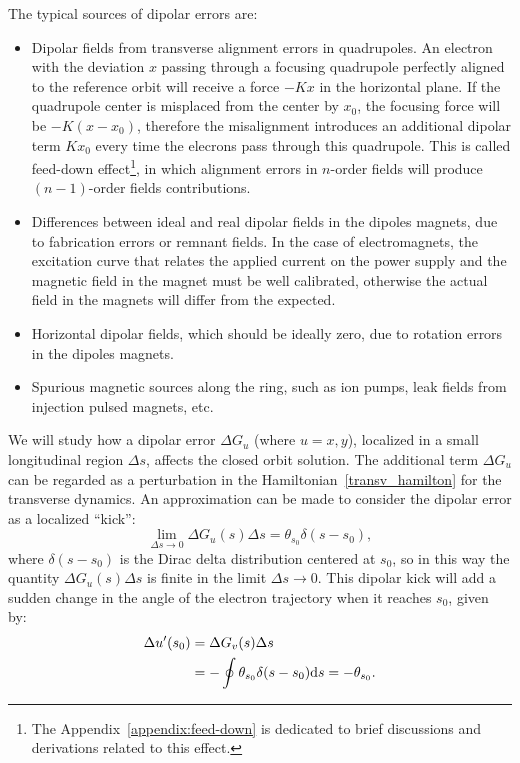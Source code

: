 The typical sources of dipolar errors are:
\begin{itemize}
    \item Dipolar fields from transverse alignment errors in quadrupoles. An electron with the deviation $x$ passing through a focusing quadrupole perfectly aligned to the reference orbit will receive a force $-Kx$ in the horizontal plane. If the quadrupole center is misplaced from the center by $x_0$, the focusing force will be $-K(x - x_0)$, therefore the misalignment introduces an additional dipolar term $K x_0$ every time the elecrons pass through this quadrupole. This is called feed-down effect\footnote{The Appendix~\ref{appendix:feed-down} is dedicated to brief discussions and derivations related to this effect.}, in which alignment errors in $n$-order fields will produce $(n-1)$-order fields contributions.
    \item Differences between ideal and real dipolar fields in the dipoles magnets, due to fabrication errors or remnant fields. In the case of electromagnets, the excitation curve that relates the applied current on the power supply and the magnetic field in the magnet must be well calibrated, otherwise the actual field in the magnets will differ from the expected. 
    \item Horizontal dipolar fields, which should be ideally zero, due to rotation errors in the dipoles magnets.
    \item Spurious magnetic sources along the ring, such as ion pumps, leak fields from injection pulsed magnets, etc.
\end{itemize}
We will study how a dipolar error $\Delta G_u$ (where $u=x, y$), localized in a small longitudinal region $\Delta s$, affects the closed orbit solution. The additional term $\Delta G_u$ can be regarded as a perturbation in the Hamiltonian~\eqref{transv_hamilton} for the transverse dynamics. An approximation can be made to consider the dipolar error as a localized ``kick'': 
\begin{equation*}
    \lim_{\Delta s \rightarrow 0}\Delta G_u(s)\Delta s = \theta_{s_0} \delta(s - s_0),
\end{equation*}
where $\delta(s-s_0)$ is the Dirac delta distribution centered at $s_0$, so in this way the quantity $\Delta G_u(s)\Delta s$ is finite in the limit $\Delta s \rightarrow 0$. This dipolar kick will add a sudden change in the angle of the electron trajectory when it reaches $s_0$, given by:
\begin{align*}
    \Delta u'(s_0) &= \Delta G_v(s) \Delta s \\
    &= -\oint \theta_{s_0} \delta(s - s_0) \mathrm{d} s = -\theta_{s_0}.
\end{align*}

